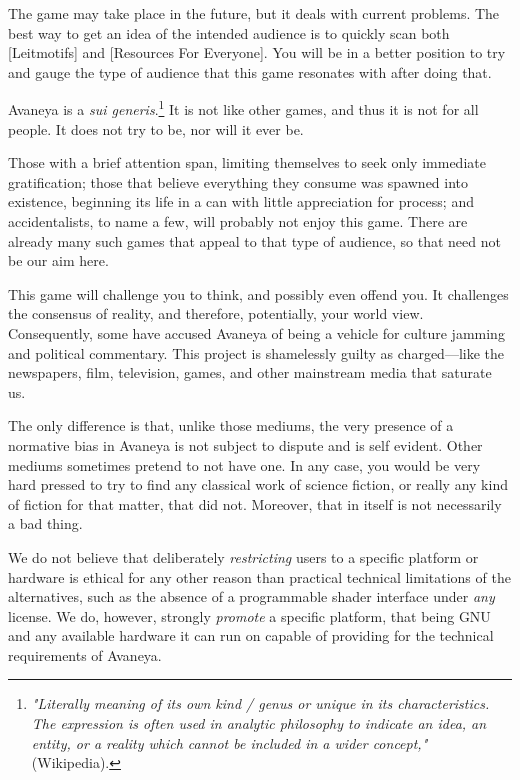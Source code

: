 The game may take place in the future, but it deals with current problems. The best way to get an idea of the intended audience is to quickly scan both [Leitmotifs] and [Resources For Everyone]. You will be in a better position to try and gauge the type of audience that this game resonates with after doing that. 

Avaneya is a {\it sui generis}.\footnote{{\it "Literally meaning of its own kind / genus or unique in its characteristics. The expression is often used in analytic philosophy to indicate an idea, an entity, or a reality which cannot be included in a wider concept,"} (Wikipedia).} It is not like other games, and thus it is not for all people. It does not try to be, nor will it ever be.

Those with a brief attention span, limiting themselves to seek only immediate gratification; those that believe everything they consume was spawned into existence, beginning its life in a can with little appreciation for process; and accidentalists, to name a few, will probably not enjoy this game. There are already many such games that appeal to that type of audience, so that need not be our aim here.

This game will challenge you to think, and possibly even offend you. It challenges the consensus of reality, and therefore, potentially, your world view. Consequently, some have accused Avaneya of being a vehicle for culture jamming and political commentary. This project is shamelessly guilty as charged---like the newspapers, film, television, games, and other mainstream media that saturate us. 

The only difference is that, unlike those mediums, the very presence of a normative bias in Avaneya is not subject to dispute and is self evident. Other mediums sometimes pretend to not have one. In any case, you would be very hard pressed to try to find any classical work of science fiction, or really any kind of fiction for that matter, that did not. Moreover, that in itself is not necessarily a bad thing.

We do not believe that deliberately {\it restricting} users to a specific platform or hardware is ethical for any other reason than practical technical limitations of the alternatives, such as the absence of a programmable shader interface under {\it any} license. We do, however, strongly {\it promote} a specific platform, that being GNU and any available hardware it can run on capable of providing for the technical requirements of Avaneya.

